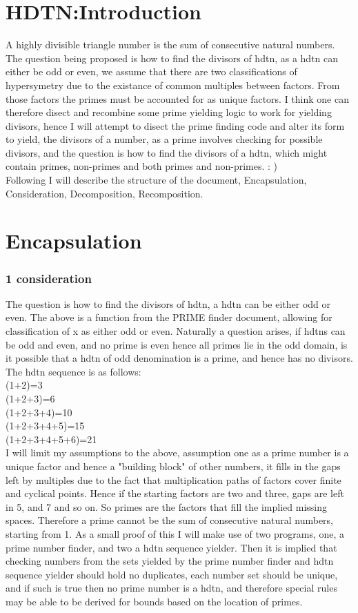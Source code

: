\documentclass{article}
\begin{document}
\maketitle
\newpage
\section{HDTN:Introduction}
A highly divisible triangle number is the sum of consecutive natural numbers. The question being
proposed is how to find the divisors of hdtn, as a hdtn can either be odd or even, we assume
that there are two classifications of hypersymetry due to the existance of common multiples 
between factors. From those factors the primes must be accounted for as unique factors.
I think one can therefore disect and recombine some prime yielding logic to work for yielding
divisors, hence I will attempt to disect the prime finding code and alter its form to yield,
the divisors of a number, as a prime involves checking for possible divisors, and the question
is how to find the divisors of a hdtn, which might contain primes, non-primes and both primes and 
non-primes. : )\\
Following I will describe the structure of the document, Encapsulation, Consideration, Decomposition,
Recomposition.
\section{Encapsulation}
\subsubsection{1 consideration}
The question is how to find the divisors of hdtn, a hdtn can be either odd or even. The above is a function
from the PRIME finder document, allowing for classification of x as either odd or even. Naturally a question
arises, if hdtns can be odd and even, and no prime is even hence all primes lie in the odd domain, is it
possible that a hdtn of odd denomination is a prime, and hence has no divisors. The hdtn sequence is as
follows:\\(1+2)=3\\(1+2+3)=6\\(1+2+3+4)=10\\(1+2+3+4+5)=15\\(1+2+3+4+5+6)=21\\ I will limit my assumptions
to the above, assumption one as a prime number is a unique factor and hence a "building block" of other
numbers, it fills in the gaps left by multiples due to the fact that multiplication paths of factors cover
finite and cyclical points. Hence if the starting factors are two and three, gaps are left in 5, and 7 and 
so on. So primes are the factors that fill the implied missing spaces. Therefore a prime cannot be the sum of
consecutive natural numbers, starting from 1. As a small proof of this I will make use of two programs,
one, a prime number finder, and two a hdtn sequence yielder. Then it is implied that checking numbers from
the sets yielded by the prime number finder and hdtn sequence yielder should hold no duplicates, each number
set should be unique, and if such is true then no prime number is a hdtn, and therefore special rules may
be able to be derived for bounds based on the location of primes.
\end{document}
